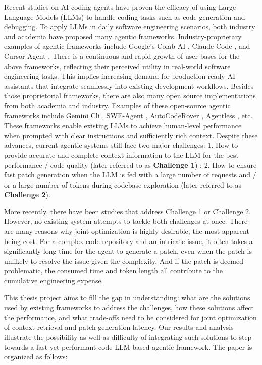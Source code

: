 Recent studies on AI coding agents have proven the efficacy of using Large Language Models (LLMs) to handle coding tasks such as code generation and debugging. To apply LLMs in daily software engineering scenarios, both industry and academia have proposed many agentic frameworks. Industry-proprietary examples of agentic frameworks include Google's Colab AI \cite{google_2025_colab_ai_first}, Claude Code \cite{anthropic_2025_claude_code_ga}, and Cursor Agent \cite{cursor_2025_agent_cli}. There is a continuous and rapid growth of user bases for the above frameworks, reflecting their perceived utility in real-world software engineering tasks. This implies increasing demand for production-ready AI assistants that integrate seamlessly into existing development workflows. Besides those proprietorial frameworks, there are also many open source implementations from both academia and industry. Examples of these open-source agentic frameworks include Gemini Cli \cite{mullen_salva_2025_gemini_cli}, SWE-Agent \cite{yang2024sweagent}, AutoCodeRover \cite{zhang2024autocoderover}, Agentless \cite{xia2024agentlessdemystifyingllmbasedsoftware}, etc. These frameworks enable existing LLMs to achieve human-level performance when prompted with clear instructions and sufficiently rich context. Despite these advances, current agentic systems still face two major challenges: 1. How to provide accurate and complete context information to the LLM for the best performance / code quality (later referred to as \textbf{Challenge 1}) \cite{ouyang2025repographenhancingaisoftware}; 2. How to ensure fast patch generation when the LLM is fed with a large number of requests and / or a large number of tokens during codebase exploration (later referred to as \textbf{Challenge 2}). 

More recently, there have been studies that address Challenge 1 or Challenge 2. However, no existing system attempts to tackle both challenges at once. There are many reasons why joint optimization is highly desirable, the most apparent being cost. For a complex code repository and an intricate issue, it often takes a significantly long time for the agent to generate a patch, even when the patch is unlikely to resolve the issue given the complexity. And if the patch is deemed problematic, the consumed time and token length all contribute to the cumulative engineering expense.

This thesis project aims to fill the gap in understanding: what are the solutions used by existing frameworks to address the challenges, how these solutions affect the performance, and what trade-offs need to be considered for joint optimization of context retrieval and patch generation latency. Our results and analysis illustrate the possibility as well as difficulty of integrating such solutions to step towards a fast yet performant code LLM-based agentic framework. The paper is organized as follows:


